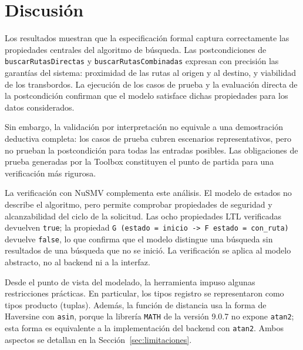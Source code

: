 \section{Discusión}
\label{sec:discusion}

Los resultados muestran que la especificación formal captura
correctamente las propiedades centrales del algoritmo de búsqueda. Las
postcondiciones de \texttt{buscarRutasDirectas} y
\texttt{buscarRutasCombinadas} expresan con precisión las garantías del
sistema: proximidad de las rutas al origen y al destino, y viabilidad de
los transbordos. La ejecución de los casos de prueba y la evaluación
directa de la postcondición confirman que el modelo satisface dichas
propiedades para los datos considerados.

Sin embargo, la validación por interpretación no equivale a una
demostración deductiva completa: los casos de prueba cubren escenarios
representativos, pero no prueban la postcondición para todas las
entradas posibles. Las obligaciones de prueba generadas por la Toolbox
constituyen el punto de partida para una verificación más rigurosa.

La verificación con NuSMV complementa este análisis. El modelo de
estados no describe el algoritmo, pero permite comprobar propiedades de
seguridad y alcanzabilidad del ciclo de la solicitud. Las ocho
propiedades LTL verificadas devuelven \texttt{true}; la propiedad
\texttt{G (estado = inicio -> F estado = con\_ruta)} devuelve
\texttt{false}, lo que confirma que el modelo distingue una búsqueda sin
resultados de una búsqueda que no se inició. La verificación se aplica
al modelo abstracto, no al backend ni a la interfaz.

Desde el punto de vista del modelado, la herramienta impuso algunas
restricciones prácticas. En particular, los tipos registro se
representaron como tipos producto (tuplas). Además, la función de
distancia usa la forma de Haversine con \texttt{asin}, porque la librería
\texttt{MATH} de la versión 9.0.7 no expone \texttt{atan2}; esta forma es
equivalente a la implementación del backend con \texttt{atan2}. Ambos
aspectos se detallan en la Sección~\ref{sec:limitaciones}.

